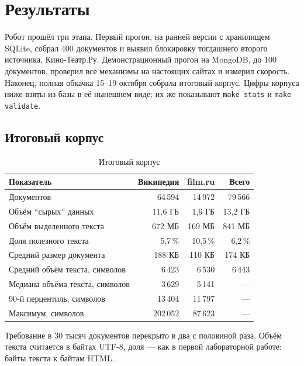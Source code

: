 \section{Результаты}

Робот прошёл три этапа. Первый прогон, на ранней версии с хранилищем SQLite,
собрал 400 документов и выявил блокировку тогдашнего второго источника,
Кино-Театр.Ру. Демонстрационный прогон на MongoDB, до 100 документов, проверил
все механизмы на настоящих сайтах и измерил скорость. Наконец, полная обкачка
15--19 октября собрала итоговый корпус. Цифры корпуса ниже взяты из базы в её
нынешнем виде; их же показывают \texttt{make stats} и \texttt{make validate}.

\subsection*{Итоговый корпус}

\begin{table}[h]
\centering
\begin{tabular}{|l|r|r|r|}
\hline
\textbf{Показатель} & \textbf{Википедия} & \textbf{film.ru} & \textbf{Всего} \\
\hline
Документов                          & 64\,594 & 14\,972 & 79\,566 \\
Объём \enquote{сырых} данных        & 11,6 ГБ & 1,6 ГБ & 13,2 ГБ \\
Объём выделенного текста            & 672 МБ & 169 МБ & 841 МБ \\
Доля полезного текста               & 5,7\,\% & 10,5\,\% & 6,2\,\% \\
Средний размер документа            & 188 КБ & 110 КБ & 174 КБ \\
Средний объём текста, символов      & 6\,423 & 6\,530 & 6\,443 \\
Медиана объёма текста, символов     & 3\,629 & 5\,141 & --- \\
90-й перцентиль, символов           & 13\,404 & 11\,797 & --- \\
Максимум, символов                  & 202\,052 & 87\,623 & --- \\
\hline
\end{tabular}
\caption{Итоговый корпус}
\label{tab:corpus}
\end{table}

Требование в 30 тысяч документов перекрыто в два с половиной раза. Объём текста
считается в байтах UTF-8, доля --- как в первой лабораторной работе: байты
текста к байтам HTML.

